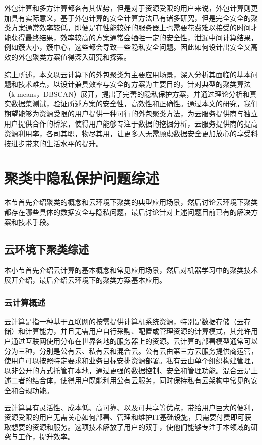 外包计算和多方计算都各有其优势，但是对于资源受限的用户来说，外包计算则更加具有实际意义，基于外包计算的安全计算方法已有诸多研究，但是完全安全的聚类方案通常效率较低，即便是在性能较好的服务器上也需要花费难以接受的时间才能获得最终结果，效率较高的方案通常会牺牲一定的安全性，泄漏中间计算结果，例如簇大小，簇中心，这些都会导致一些隐私安全问题。因此如何设计出安全又高效的外包聚类方案值得深入研究和探索。

综上所述，本文以云计算下的外包聚类为主要应用场景，深入分析其面临的基本问题和技术难点，以设计兼具效率与安全的方案为主要目的，针对典型的聚类算法（k-means，DBSCAN）展开，提出了完善的隐私保护方案，并通过理论分析和真实数据集测试，验证所述方案的安全性，高效性和正确性。通过本文的研究，我们期望能够为资源受限的用户提供一种可行的外包聚类方法，为云服务提供商与独立用户提供合作的桥梁，使得用户能够专注于数据的挖掘分析，云服务提供商的提高资源利用率，各司其职，物尽其用，让更多人无需顾虑数据安全更加放心的享受科技进步带来的生活水平的提升。
\section{聚类中隐私保护问题综述}
本节首先介绍聚类的概念和云环境下聚类的典型应用场景，然后讨论云环境下聚类都存在哪些具体的数据安全与隐私问题，最后讨论针对上述问题目前已有的解决方案和技术手段。
\subsection{云环境下聚类综述}
本小节首先介绍云计算的基本概念和常见应用场景，然后对机器学习中的聚类技术展开介绍，最后介绍云环境下的聚类方案基本应用。
\subsubsection{云计算概述}
云计算是指一种基于互联网的按需提供计算机系统资源，特别是数据存储（云存储）和计算能力，并且无需用户自行采购、配置或管理资源的计算模式\cite{montazerolghaem2020green}，其允许用户通过互联网使用分布在世界各地的服务器上的资源。云计算的部署模型通常可以分为三种，分别是公有云、私有云和混合云。公有云由第三方云服务提供商运营，使用户可以按照特定要求和业务目标安排资源部署。私有云由单个组织构建管理，以非公开的方式托管在本地，通过更强的数据控制、安全和管理功能。混合云是上述二者的结合体，使得用户既能利用公有云服务，同时保持私有云架构中常见的安全和合规功能。

云计算具有灵活性、成本低、高可靠、以及可共享等优点，带给用户巨大的便利，资源受限的用户无需关心如何部署、管理和维护IT基础设施，只需要付费即可获取想要的资源和服务。这项技术解放了用户的双手，使他们能够专注于本领域的研究与工作，提升效率。

